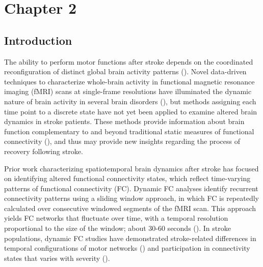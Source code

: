 \documentclass[phd,tocprelim]{cornell}
\begin{document}
\label{chap:1}

\chapter{Chapter 2}

\section{Introduction}
	The ability to perform motor functions after stroke depends on the coordinated reconfiguration of distinct global brain activity patterns (\cite{Park2011-kx}). Novel data-driven techniques to characterize whole-brain activity in functional magnetic resonance imaging (fMRI) scans at single-frame resolutions have illuminated the dynamic nature of brain activity in several brain disorders (\cite{ Braun2021-iy, Adhikari2020-tk, Kaiser2019-rf,  Parker_Singleton2021-ur}), but methods assigning each time point to a discrete state have not yet been applied to examine altered brain dynamics in stroke patients. These methods provide information about brain function complementary to and beyond traditional static measures of functional connectivity (\cite{Cornblath2020-nc}), and thus may provide new insights regarding the process of recovery following stroke.
	
	Prior work characterizing spatiotemporal brain dynamics after stroke has focused on identifying altered functional connectivity states, which reflect time-varying patterns of functional connectivity (FC). Dynamic FC analyses identify recurrent connectivity patterns using a sliding window approach, in which FC is repeatedly calculated over consecutive windowed segments of the fMRI scan. This approach yields FC networks that fluctuate over time, with a temporal resolution proportional to the size of the window; about 30-60 seconds (\cite{Savva2019-hk}). In stroke populations, dynamic FC studies have demonstrated stroke-related differences in temporal configurations of motor networks (\cite{Bonkhoff2020-bx}) and participation in connectivity states that varies with severity (\cite{Bonkhoff2020-de}). 
	
\end{document}
